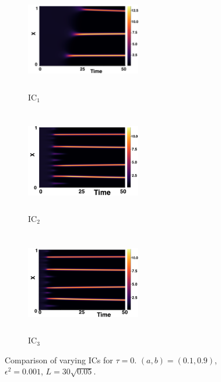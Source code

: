 \begin{figure}[H]
    \centering
    \begin{subfigure}[b]{0.32\textwidth}
        \centering
        \includegraphics[width=5cm,height=4.5cm]{gaff0.png}
        \caption{$\text{IC}_1$}
        \label{}
    \end{subfigure}
    \hfill
    \begin{subfigure}[b]{0.32\textwidth}
        \centering
        \includegraphics[width=5cm,height=4.5cm]{ic20.png}
        \caption{$\text{IC}_2$}
        \label{}
    \end{subfigure}
    \hfill
    \begin{subfigure}[b]{0.32\textwidth}
        \centering
        \includegraphics[width=5cm,height=4.5cm]{ic30.png}
        \caption{$\text{IC}_3$}
        \label{}
    \end{subfigure}
    \caption{Comparison of varying ICs for $\tau=0$. $(a,b)=(0.1,0.9)$, $\epsilon^2=0.001$, $L=30\sqrt{0.05}$.}
    \label{fig:figtau0}
\end{figure}
